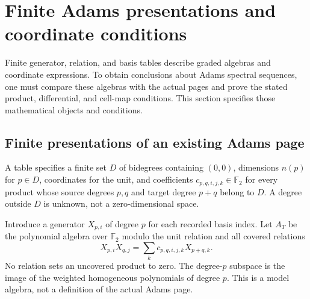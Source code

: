 \section{Finite Adams presentations and coordinate conditions}
\label{chap:computation-schema}

Finite generator, relation, and basis tables describe graded algebras and
coordinate expressions. To obtain conclusions about Adams spectral sequences,
one must compare these algebras with the actual pages and prove the stated
product, differential, and cell-map conditions. This section specifies those
mathematical objects and conditions.

\subsection{Finite presentations of an existing Adams page}

\begin{definition}
  \label{def:adams-e2-basis-table}
  A table specifies a finite set $D$ of bidegrees containing $(0,0)$,
  dimensions $n(p)$ for $p\in D$, coordinates for the unit, and coefficients
  $c_{p,q,i,j,k}\in\mathbb F_2$ for every product whose source degrees
  $p,q$ and target degree $p+q$ belong to $D$.
  A degree outside $D$ is unknown, not a zero-dimensional space.
\end{definition}

\begin{definition}
  \label{def:adams-e2-table-model}
  Introduce a generator $X_{p,i}$ of degree $p$ for each recorded basis
  index.  Let $A_T$ be the polynomial algebra over $\mathbb F_2$ modulo
  the unit relation and all covered relations
  \[
    X_{p,i}X_{q,j}=\sum_k c_{p,q,i,j,k}X_{p+q,k}.
  \]
  No relation sets an uncovered product to zero.  The degree-$p$ subspace
  is the image of the weighted homogeneous polynomials of degree $p$.
  This is a model algebra, not a definition of the actual Adams page.
\end{definition}

